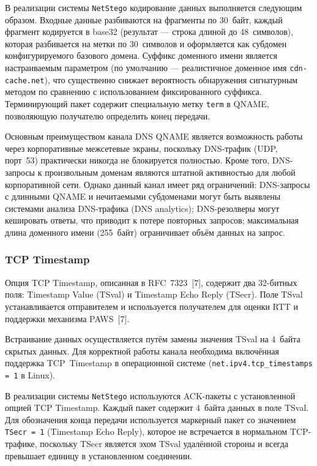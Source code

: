 В реализации системы \texttt{NetStego} кодирование данных выполняется следующим образом. Входные данные разбиваются на фрагменты по 30~байт, каждый фрагмент кодируется в base32 (результат --- строка длиной до 48~символов), которая разбивается на метки по 30~символов и оформляется как субдомен конфигурируемого базового домена. Суффикс доменного имени является настраиваемым параметром (по умолчанию --- реалистичное доменное имя \texttt{cdn-cache.net}), что существенно снижает вероятность обнаружения сигнатурным методом по сравнению с использованием фиксированного суффикса. Терминирующий пакет содержит специальную метку \texttt{term} в QNAME, позволяющую получателю определить конец передачи.

Основным преимуществом канала DNS QNAME является возможность работы через корпоративные межсетевые экраны, поскольку DNS-трафик (UDP, порт~53) практически никогда не блокируется полностью. Кроме того, DNS-запросы к произвольным доменам являются штатной активностью для любой корпоративной сети. Однако данный канал имеет ряд ограничений: DNS-запросы с длинными QNAME и нечитаемыми субдоменами могут быть выявлены системами анализа DNS-трафика (DNS analytics); DNS-резолверы могут кешировать ответы, что приводит к потере повторных запросов; максимальная длина доменного имени (255~байт) ограничивает объём данных на запрос.

\subsubsection{TCP Timestamp}

Опция TCP Timestamp, описанная в RFC~7323~[7], содержит два 32-битных поля: Timestamp Value (TSval) и Timestamp Echo Reply (TSecr). Поле TSval устанавливается отправителем и используется получателем для оценки RTT и поддержки механизма PAWS~[7].

Встраивание данных осуществляется путём замены значения TSval на 4~байта скрытых данных. Для корректной работы канала необходима включённая поддержка TCP~Timestamp в операционной системе (\texttt{net.ipv4.tcp\_timestamps = 1} в Linux).

В реализации системы \texttt{NetStego} используются ACK-пакеты с установленной опцией TCP Timestamp. Каждый пакет содержит 4~байта данных в поле TSval. Для обозначения конца передачи используется маркерный пакет со значением \texttt{TSecr~=~1} (Timestamp Echo Reply), которое не встречается в нормальном TCP-трафике, поскольку TSecr является эхом TSval удалённой стороны и всегда превышает единицу в установленном соединении.

